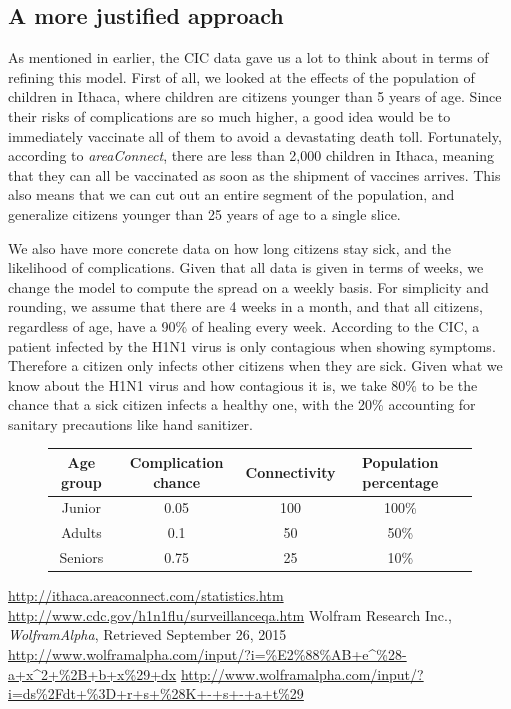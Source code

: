 \documentclass{article}
\begin{document}
\subsection{A more justified approach}
\par As mentioned in earlier, the CIC data gave us a lot to think about in terms of refining this model. First of all, we looked at the effects of the population of children in Ithaca, where children are citizens younger than 5 years of age. Since their risks of complications are so much higher, a good idea would be to immediately vaccinate all of them to avoid a devastating death toll. Fortunately, according to \emph{areaConnect}, there are less than 2,000 children in Ithaca, meaning that they can all be vaccinated as soon as the shipment of vaccines arrives. This also means that we can cut out an entire segment of the population, and generalize citizens younger than 25 years of age to a single slice.
\par We also have more concrete data on how long citizens stay sick, and the likelihood of complications. Given that all data is given in terms of weeks, we change the model to compute the spread on a weekly basis. For simplicity and rounding, we assume that there are 4 weeks in a month, and that all citizens, regardless of age, have a 90\% of healing every week. According to the CIC, a patient infected by the H1N1 virus is only contagious when showing symptoms. Therefore a citizen only infects other citizens when they are sick. Given what we know about the H1N1 virus and how contagious it is, we take 80\% to be the chance that a sick citizen infects a healthy one, with the 20\% accounting for sanitary precautions like hand sanitizer.
\par

\begin{figure}[H]
\centering
\begin{tabular}{c|c|c|c|c}
Age group & Complication chance & Connectivity & Population percentage\\ \hline
Junior & 0.05 & 100 & 100\%\\
Adults & 0.1 & 50 & 50\%\\
Seniors & 0.75 & 25 & 10\%
\end{tabular}
\end{figure}

\begin{thebibliography}{9}
	\url{http://ithaca.areaconnect.com/statistics.htm}
	\url{http://www.cdc.gov/h1n1flu/surveillanceqa.htm}
	Wolfram Research Inc.,
	\emph{WolframAlpha},
	Retrieved September 26, 2015
	\url{http://www.wolframalpha.com/input/?i=\%E2\%88\%AB+e\^\%28-a+x\^2+\%2B+b+x\%29+dx}
	\url{http://www.wolframalpha.com/input/?i=ds\%2Fdt+\%3D+r+s+\%28K+-+s+-+a+t\%29}
\end{thebibliography}
\end{document}
